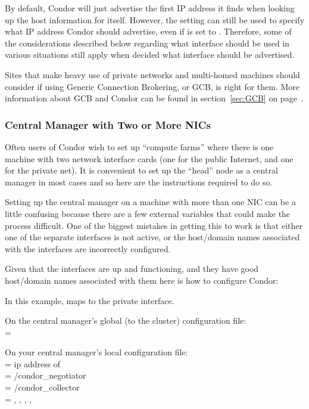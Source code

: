 By default, Condor will just advertise the first IP address it finds
when looking up the host information for itself.  
However, the  setting can still be used to
specify what IP address Condor should advertise, even if
 is set to \verb@TRUE@.
Therefore, some of the considerations described below regarding what
interface should be used in various situations still apply when
decided what interface should be advertised.

Sites that make heavy use of private networks and multi-homed machines
should consider if using Generic Connection Brokering, or GCB, is
right for them.
More information about GCB and Condor can be found in
section~\ref{sec:GCB} on page~\pageref{sec:GCB}.


\subsubsection{Central Manager with Two or More NICs}

Often users of Condor wish to set up ``compute farms'' where there is one
machine with two network interface cards (one for the public Internet,
and one for the private net). It is convenient to set up the ``head''
node as a central manager in most cases and so here are the instructions
required to do so.

Setting up the central manager on a machine with more than one NIC can
be a little confusing because there are a few external variables
that could make the process difficult. One of the biggest mistakes
in getting this to work is that either one of the separate interfaces is
not active, or the host/domain names associated with the interfaces are
incorrectly configured. 

Given that the interfaces are up and functioning, and they have good
host/domain names associated with them here is how to configure Condor:

In this example,  maps to the private interface.

On the central manager's global (to the cluster) configuration file: \\
 = 

On your central manager's local configuration file: \\
 = ip address of  \\
 = /condor\_negotiator \\
 = /condor\_collector \\
 = , , , , 

